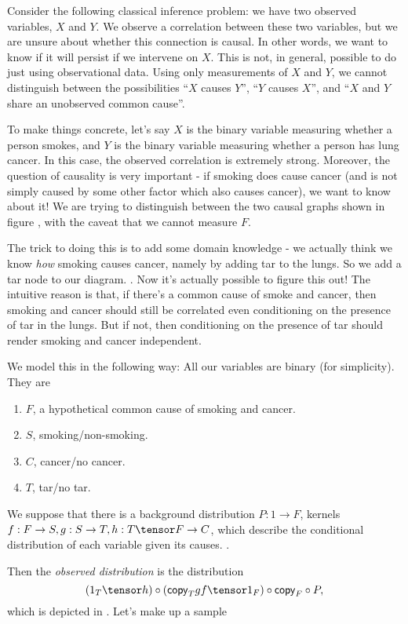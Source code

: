 \documentclass{article}
\newcommand{\cop}{\mathsf{copy}}
\begin{document}
Consider the following classical inference problem: we have two observed variables,
$X$ and $Y$. We observe a correlation between these two variables, but we are unsure about whether this connection is causal.
In other words, we want to know if it will persist if we intervene on $X$.
This is not, in general, possible to do just using observational data.
Using only measurements of $X$ and $Y$, we cannot distinguish between the possibilities
``$X$ causes $Y$'', ``$Y$ causes $X$'', and ``$X$ and $Y$ share an unobserved common cause''.

To make things concrete, let's say $X$ is the binary variable measuring whether a person smokes, and $Y$ is the binary variable measuring whether a person has lung cancer.
In this case, the observed correlation is extremely strong.
Moreover, the question of causality is very important - if smoking does cause cancer (and is not simply caused by some other factor which also causes cancer), we want to know about it!
We are trying to distinguish between the two causal graphs shown in figure , with the caveat that we cannot measure $F$.

The trick to doing this is to add some domain knowledge - we actually think we know \emph{how} smoking causes cancer, namely by adding tar to the lungs. So we add a tar node to our diagram. .
Now it's actually possible to figure this out!
The intuitive reason is that, if there's a common cause of smoke and cancer, then smoking and cancer should still be correlated even conditioning on the presence of tar in the lungs.
But if not, then conditioning on the presence of tar should render smoking and cancer independent.


We model this in the following way: 
All our variables are binary (for simplicity). They are 
\begin{enumerate}
    \item $F$, a hypothetical common cause of smoking and cancer.
    \item $S$, smoking/non-smoking.
    \item $C$, cancer/no cancer.
    \item $T$, tar/no tar.
\end{enumerate}
We suppose that there is a background distribution $P: 1 \to F$,
kernels $f: F \to S, g: S \to T, h: T \tensor F \to C$, which describe the conditional distribution of each variable given its causes. .

Then the \emph{observed distribution} is the distribution
\[(1_T \tensor h)\circ (\cop_Tgf\tensor 1_F )\circ\cop_F\circ P,\]
which is depicted in .
Let's make up a sample
\end{document}
